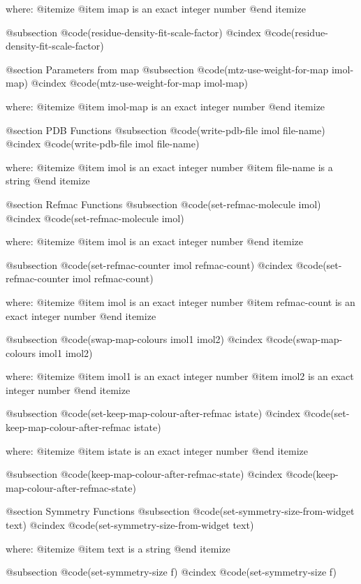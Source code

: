 where: 
 @itemize 
     @item imap is an exact integer number
 @end itemize


@subsection @code{(residue-density-fit-scale-factor)}
@cindex @code{(residue-density-fit-scale-factor)}
 

@section Parameters from map 
@subsection @code{(mtz-use-weight-for-map imol-map)}
@cindex @code{(mtz-use-weight-for-map imol-map)}
 
where: 
 @itemize 
     @item imol-map is an exact integer number
 @end itemize



@section PDB Functions 
@subsection @code{(write-pdb-file imol file-name)}
@cindex @code{(write-pdb-file imol file-name)}
 
where: 
 @itemize 
     @item imol is an exact integer number
     @item file-name is a string
 @end itemize



@section Refmac Functions 
@subsection @code{(set-refmac-molecule imol)}
@cindex @code{(set-refmac-molecule imol)}
 
where: 
 @itemize 
     @item imol is an exact integer number
 @end itemize


@subsection @code{(set-refmac-counter imol refmac-count)}
@cindex @code{(set-refmac-counter imol refmac-count)}
 
where: 
 @itemize 
     @item imol is an exact integer number
     @item refmac-count is an exact integer number
 @end itemize


@subsection @code{(swap-map-colours imol1 imol2)}
@cindex @code{(swap-map-colours imol1 imol2)}
 
where: 
 @itemize 
     @item imol1 is an exact integer number
     @item imol2 is an exact integer number
 @end itemize


@subsection @code{(set-keep-map-colour-after-refmac istate)}
@cindex @code{(set-keep-map-colour-after-refmac istate)}
 
where: 
 @itemize 
     @item istate is an exact integer number
 @end itemize


@subsection @code{(keep-map-colour-after-refmac-state)}
@cindex @code{(keep-map-colour-after-refmac-state)}
 

@section Symmetry Functions 
@subsection @code{(set-symmetry-size-from-widget text)}
@cindex @code{(set-symmetry-size-from-widget text)}
 
where: 
 @itemize 
     @item text is a string
 @end itemize


@subsection @code{(set-symmetry-size f)}
@cindex @code{(set-symmetry-size f)}
 
